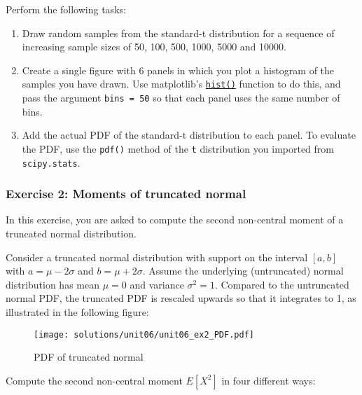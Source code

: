 \documentclass{scrartcl}
\providecommand{\tightlist}{%
      \setlength{\itemsep}{0pt}\setlength{\parskip}{0pt}}
\begin{document}
Perform the following tasks:

\begin{enumerate}
\def\labelenumi{\arabic{enumi}.}
\tightlist
\item
  Draw random samples from the standard-t distribution for a sequence of
  increasing sample sizes of 50, 100, 500, 1000, 5000 and 10000.
\item
  Create a single figure with 6 panels in which you plot a histogram of
  the samples you have drawn. Use matplotlib's
  \href{https://matplotlib.org/api/_as_gen/matplotlib.pyplot.hist.html}{\texttt{hist()}}
  function to do this, and pass the argument \texttt{bins\ =\ 50} so
  that each panel uses the same number of bins.
\item
  Add the actual PDF of the standard-t distribution to each panel. To
  evaluate the PDF, use the \texttt{pdf()} method of the \texttt{t}
  distribution you imported from \texttt{scipy.stats}.
\end{enumerate}

    \hypertarget{exercise-2-moments-of-truncated-normal}{%
\subsubsection{Exercise 2: Moments of truncated
normal}\label{exercise-2-moments-of-truncated-normal}}

In this exercise, you are asked to compute the second non-central moment
of a truncated normal distribution.

Consider a truncated normal distribution with support on the interval
\([a,b]\) with \(a = \mu-2\sigma\) and \(b=\mu+2\sigma\). Assume the
underlying (untruncated) normal distribution has mean \(\mu = 0\) and
variance \(\sigma^2 = 1\). Compared to the untruncated normal PDF, the
truncated PDF is rescaled upwards so that it integrates to 1, as
illustrated in the following figure:

\begin{figure}
\centering
\texttt{[image: solutions/unit06/unit06\_ex2\_PDF.pdf]}
\caption{PDF of truncated normal}
\end{figure}

Compute the second non-central moment \(E[X^2]\) in four different ways:
\end{document}

